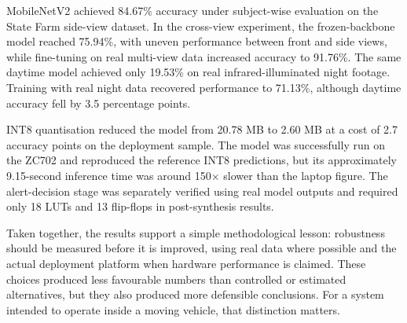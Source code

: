 MobileNetV2 achieved 84.67\% accuracy under subject-wise evaluation on the State Farm side-view dataset. In the cross-view experiment, the frozen-backbone model reached 75.94\%, with uneven performance between front and side views, while fine-tuning on real multi-view data increased accuracy to 91.76\%. The same daytime model achieved only 19.53\% on real infrared-illuminated night footage. Training with real night data recovered performance to 71.13\%, although daytime accuracy fell by 3.5 percentage points.

INT8 quantisation reduced the model from 20.78 MB to 2.60 MB at a cost of 2.7 accuracy points on the deployment sample. The model was successfully run on the ZC702 and reproduced the reference INT8 predictions, but its approximately 9.15-second inference time was around 150$\times$ slower than the laptop figure. The alert-decision stage was separately verified using real model outputs and required only 18 LUTs and 13 flip-flops in post-synthesis results.

Taken together, the results support a simple methodological lesson: robustness should be measured before it is improved, using real data where possible and the actual deployment platform when hardware performance is claimed. These choices produced less favourable numbers than controlled or estimated alternatives, but they also produced more defensible conclusions. For a system intended to operate inside a moving vehicle, that distinction matters.